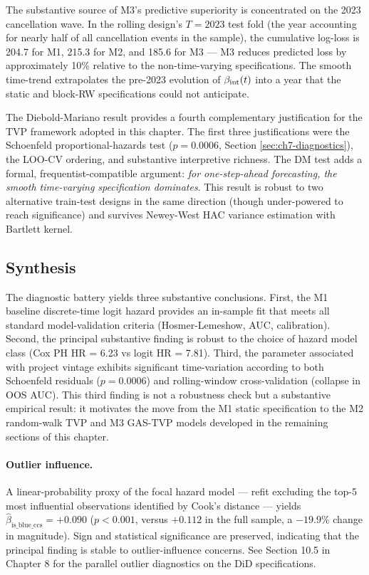 The substantive source of M3's predictive superiority is concentrated on the 2023 cancellation wave. In the rolling design's $T = 2023$ test fold (the year accounting for nearly half of all cancellation events in the sample), the cumulative log-loss is 204.7 for M1, 215.3 for M2, and 185.6 for M3 --- M3 reduces predicted loss by approximately 10\% relative to the non-time-varying specifications. The smooth time-trend extrapolates the pre-2023 evolution of $\beta_{\mathrm{int}}(t)$ into a year that the static and block-RW specifications could not anticipate.

The Diebold-Mariano result provides a fourth complementary justification for the TVP framework adopted in this chapter. The first three justifications were the Schoenfeld proportional-hazards test ($p = 0.0006$, Section \ref{sec:ch7-diagnostics}), the LOO-CV ordering, and substantive interpretive richness. The DM test adds a formal, frequentist-compatible argument: \emph{for one-step-ahead forecasting, the smooth time-varying specification dominates}. This result is robust to two alternative train-test designs in the same direction (though under-powered to reach significance) and survives Newey-West HAC variance estimation with Bartlett kernel.

\subsection{Synthesis}

The diagnostic battery yields three substantive conclusions. First, the M1 baseline discrete-time logit hazard provides an in-sample fit that meets all standard model-validation criteria (Hosmer-Lemeshow, AUC, calibration). Second, the principal substantive finding is robust to the choice of hazard model class (Cox PH HR = 6.23 vs logit HR = 7.81). Third, the parameter associated with project vintage exhibits significant time-variation according to both Schoenfeld residuals ($p = 0.0006$) and rolling-window cross-validation (collapse in OOS AUC). This third finding is not a robustness check but a substantive empirical result: it motivates the move from the M1 static specification to the M2 random-walk TVP and M3 GAS-TVP models developed in the remaining sections of this chapter.



\paragraph{Outlier influence.} A linear-probability proxy of the focal hazard model — refit excluding the top-5 most influential observations identified by Cook's distance — yields $\hat\beta_{\mathrm{is\_blue\_ccs}} = +0.090$ ($p < 0.001$, versus $+0.112$ in the full sample, a $-19.9\%$ change in magnitude). Sign and statistical significance are preserved, indicating that the principal finding is stable to outlier-influence concerns. See Section 10.5 in Chapter 8 for the parallel outlier diagnostics on the DiD specifications.

